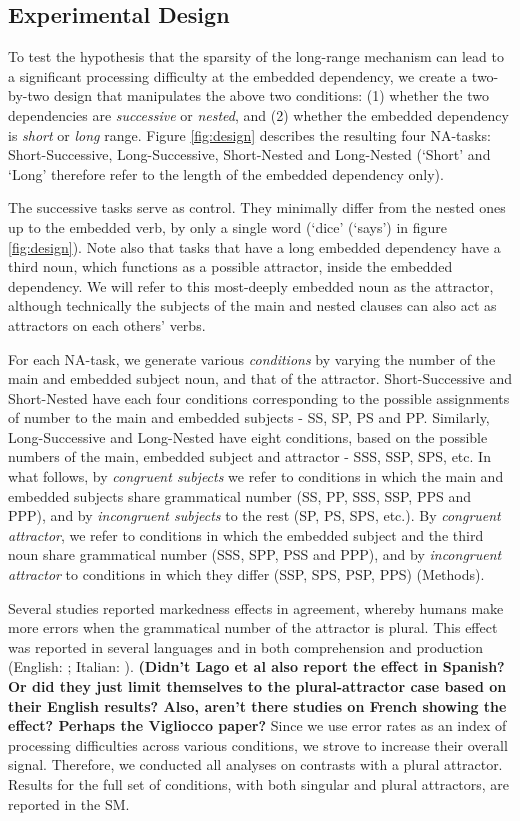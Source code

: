 \subsection{Experimental Design}
To test the hypothesis that the sparsity of the long-range mechanism can lead to a significant processing difficulty at the embedded dependency, we create a two-by-two design that manipulates the above two conditions: (1) whether the two dependencies are \textit{successive} or \textit{nested}, and (2) whether the embedded dependency is \textit{short} or \textit{long} range. 
Figure \ref{fig:design} describes the resulting four NA-tasks: Short-Successive, Long-Successive, Short-Nested and Long-Nested (`Short' and `Long' therefore refer to the length of the embedded dependency only). 

The successive tasks serve as control. They minimally differ from the nested ones up to the embedded verb, by only a single word (`dice' (`says') in figure \ref{fig:design}). Note also that tasks that have a long embedded dependency have a third noun, which functions as a possible attractor, inside the embedded dependency. We will refer to this most-deeply embedded noun as the attractor, although technically the subjects of the main and nested clauses can also act as attractors on each others' verbs.

For each NA-task, we generate various \textit{conditions} by varying the number of the main and embedded subject noun, and that of the attractor. Short-Successive and Short-Nested have each four conditions corresponding to the possible assignments of number to the main and embedded subjects - SS, SP, PS and PP. Similarly, Long-Successive and Long-Nested have eight conditions, based on the possible numbers of the main, embedded subject and attractor - SSS, SSP, SPS, etc. In what follows, by \textit{congruent subjects} we refer to conditions in which the main and embedded subjects share grammatical number (SS, PP, SSS, SSP, PPS and PPP), and by \textit{incongruent subjects} to the rest (SP, PS, SPS, etc.). By \textit{congruent attractor}, we refer to conditions in which the embedded subject and the third noun share grammatical number (SSS, SPP, PSS and PPP), and by \textit{incongruent attractor} to conditions in which they differ (SSP, SPS, PSP, PPS) (Methods).

Several studies reported markedness effects in agreement, whereby humans make more errors when the grammatical number of the attractor is plural. This effect was reported in several languages and in both comprehension and production (English: \citet{Bock:Miller:1991, eberhard1997marked, wagers2009agreement, lago2015agreement}; Italian: \citet{vigliocco1995constructing}). \textbf{(Didn't Lago et al also report the effect in Spanish? Or did they just limit themselves to the plural-attractor case based on their English results? Also, aren't there studies on French showing the effect? Perhaps the Vigliocco paper?} Since we use error rates as an index of processing difficulties across various conditions, we strove to increase their overall signal. Therefore, we conducted all analyses on contrasts with a plural attractor.
Results for the full set of conditions, with both singular and plural attractors, are reported in the SM.

